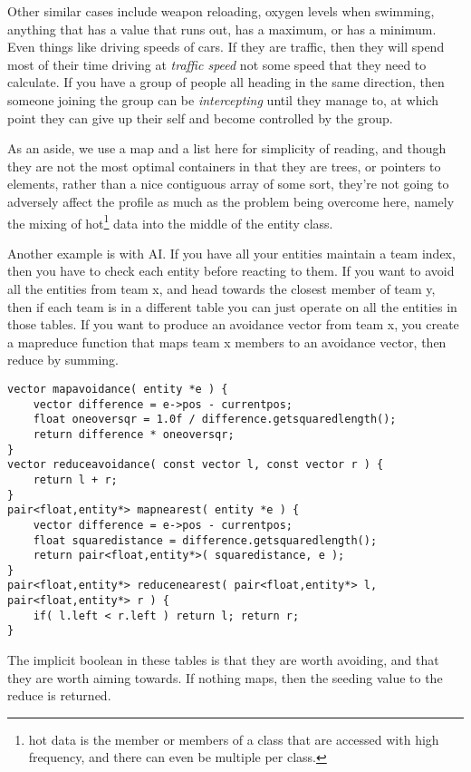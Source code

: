 Other similar cases include weapon reloading, oxygen levels when swimming,
anything that has a value that runs out, has a maximum, or has a minimum. Even
things like driving speeds of cars. If they are traffic, then they will spend
most of their time driving at {\em traffic speed} not some speed that they need
to calculate. If you have a group of people all heading in the same direction,
then someone joining the group can be {\em intercepting} until they manage to,
at which point they can give up their self and become controlled by the group.

As an aside, we use a map and a list here for simplicity of reading, and though
they are not the most optimal containers in that they are trees, or pointers to
elements, rather than a nice contiguous array of some sort, they're not going
to adversely affect the profile as much as the problem being overcome here,
namely the mixing of hot\footnote{hot data is the member or members of a class
that are accessed with high frequency, and there can even be multiple per
class.} data into the middle of the entity class.

Another example is with AI. If you have all your entities maintain a team
index, then you have to check each entity before reacting to them. If you want
to avoid all the entities from team x, and head towards the closest member of
team y, then if each team is in a different table you can just operate on all
the entities in those tables. If you want to produce an avoidance vector from
team x, you create a mapreduce function that maps team x members to an
avoidance vector, then reduce by summing.

\begin{lstlisting}[caption=map and reduce]
vector mapavoidance( entity *e ) {
	vector difference = e->pos - currentpos;
	float oneoversqr = 1.0f / difference.getsquaredlength();
	return difference * oneoversqr;
}
vector reduceavoidance( const vector l, const vector r ) {
	return l + r;
}
pair<float,entity*> mapnearest( entity *e ) {
	vector difference = e->pos - currentpos;
	float squaredistance = difference.getsquaredlength();
	return pair<float,entity*>( squaredistance, e );
}
pair<float,entity*> reducenearest( pair<float,entity*> l, pair<float,entity*> r ) {
	if( l.left < r.left ) return l; return r;
}
\end{lstlisting}

The implicit boolean in these tables is that they are worth avoiding, and that
they are worth aiming towards. If nothing maps, then the seeding value to the reduce is returned.

